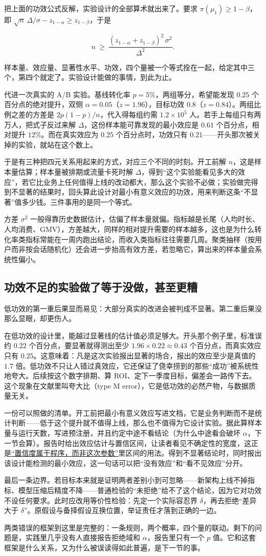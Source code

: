 把上面的功效公式反解，实验设计的全部算术就出来了。要求 \(\pi(\mu_1)\ge 1-\beta\)，即 \(\sqrt n\,\Delta/\sigma-z_{1-\alpha}\ge z_{1-\beta}\)，于是

\[
n\ \ge\ \frac{(z_{1-\alpha}+z_{1-\beta})^2\,\sigma^2}{\Delta^2}.
\]

样本量、效应量、显著性水平、功效，四个量被一个等式拴在一起，给定其中三个，第四个就定了。实验设计能做的事情，到此为止。

代进一次真实的 A/B 实验。基线转化率 \(p=5\%\)，两组等分，希望能发现 \(0.25\) 个百分点的绝对提升，双侧 \(\alpha=0.05\)（\(z=1.96\)），目标功效 \(0.8\)（\(z=0.84\)）。两组比例之差的方差是 \(2p(1-p)/n\)，代入得每组约需 \(1.2\times 10^{5}\) 人。若手上每组只有两万人，把式子反过来解 \(\Delta\)，这份样本能可靠发现的最小效应是 \(0.61\) 个百分点，相对提升 \(12\%\)。而在真实效应为 \(0.25\) 个百分点时，功效只有 \(0.21\)——开头那次被关掉的实验，就站在这个数上。

于是有三种把四元关系用起来的方式，对应三个不同的时刻。开工前解 \(n\)，这是样本量估算；样本量被排期或流量卡死时解 \(\Delta\)，得到``这个实验能看见多大的效应''，若它比业务上任何值得上线的改动都大，那么这个实验不必做；实验做完得到不显著的结果时，回头算此设计对最小有意义效应的功效，用来判断这条``不显著''值多少钱。三件事用的是同一个等式。

方差 \(\sigma^2\) 一般得靠历史数据估计，估偏了样本量就偏。指标越是长尾（人均时长、人均消费、GMV），方差越大，同样的相对提升需要的样本越多，这也是为什么转化率类指标常能在一周内跑出结论，而收入类指标往往需要几周。聚类抽样（按用户而非按会话随机化）还会进一步抬高有效方差，若忽略它，算出来的样本量会系统性偏小。

\subsection{功效不足的实验做了等于没做，甚至更糟}

低功效的第一重后果显而易见：大部分真实的改进会被判成不显著。第二重后果没那么显眼，却更伤人。

在低功效的设计里，能越过显著线的估计值必须足够大。开头那个例子里，标准误约 \(0.22\) 个百分点，要显著就得测出至少 \(1.96\times 0.22\approx 0.43\) 个百分点，而真实效应只有 \(0.25\)。这意味着：凡是这次实验报出显著的场合，报出的效应至少是真值的 \(1.7\) 倍。低功效不只让人错过真效应，它还保证了侥幸捞到的那些``成功''被系统性地夸大。后续按这个数字排期、算 ROI、定下一季度目标，偏差会一路传下去。这个现象在文献里叫夸大比（type M error），它是低功效的必然产物，与数据质量无关。

一份可以照做的清单。开工前把最小有意义效应写进文档，它是业务判断而不是统计判断——低于这个提升就不值得上线，那么也不值得为它设计实验。据此算样本量与运行天数，写进预注册，并且约定中途不看结论（为什么中途看会破坏 \(\alpha\)，下一节会算）。报告时给出效应估计与置信区间，让读者看见不确定性的宽度，这正是\hyperref[sec:11-Mathematical-Statistics/04-Interval-Estimation/01]{``置信度属于程序，而非这次参数''}里区间的用法。得到不显著结论时，同时报出该设计能检测的最小效应，这一句话可以把``没有效应''和``看不见效应''分开。

最后一条边界。若目标本来就是证明两者差别小到可忽略——新架构上线不掉指标、模型压缩后精度不降——普通检验的``未拒绝''给不了这个结论，因为它对功效不设任何要求。此时应改用等价性检验：先定一个实际容忍界 \(\delta\)，再去拒绝``差异大于 \(\delta\)''。原假设与备择假设互换位置，举证责任才落到正确的一边。

两类错误的框架到这里是完整的：一条规则，两个概率，四个量的联动。剩下的问题是，实践里几乎没有人直接报告拒绝域和 \(\alpha\)，报告里只有一个 \(p\) 值。它和这套框架是什么关系，又为什么被误读得如此普遍，是下一节的事。
